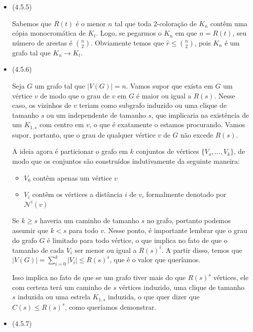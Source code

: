 \documentclass{article}
\begin{document}
\begin{itemize}
	\item (4.5.5)

	      Sabemos que \(R(t)\) é o menor \(n\) tal que toda 2-coloração de \(K_n\) contêm uma cópia monocromática de \(K_t\). Logo, se pegarmos o \(K_n\) em que \(n = R(t)\), seu número de arestas é \(\binom{n}{2}\). Obviamente temos que
	      \(\hat{r} \leq \binom{n}{2}\), pois \(K_n\) é um grafo tal que \(K_n \rightarrow K_t\).

	\item (4.5.6)

	      Seja \(G\) um grafo tal que \(|V(G)| = n\). Vamos supor que exista em \(G\) um vértice \(v\) de modo que o grau de \(v\) em \(G\) é maior ou igual a \(R(s)\).
	      Nesse caso, os vizinhos de \(v\) teriam como subgrafo induzido ou uma clique de tamanho \(s\) ou um independente de tamanho \(s\), que implicaria na existência de um \(K_{1, s}\) com centro em \(v\),
	      o que é exatamente o estamos procurando. Vamos supor, portanto, que o grau de qualquer vértice \(v\) de \(G\) não excede \(R(s)\).

	      A ideia agora é particionar o grafo em \(k\) conjuntos de vértices \(\{V_o, \dots, V_k\}\), de modo que os conjuntos são construídos indutivamente da seguinte maneira:

	      \begin{itemize}
		      \item \(V_0\) contêm apenas um vértice \(v\)
		      \item \(V_i\) contêm os vértices a distância \(i\) de \(v\), formalmente denotado por \(\mathcal{N}^i(v)\)
	      \end{itemize}

	      Se \(k \geq s\) haveria um caminho de tamanho \(s\) no grafo, portanto podemos assumir que \(k < s\) para todo \(v\).
	      Nesse ponto, é importante lembrar que o grau do grafo \(G\) é limitado para todo vértice, o que implica no fato de que o tamanho de cada \(V_i\)
	      ser menor ou igual a \(R(s)^i\). A partir disso, temos que \(|V(G)| = \sum_{i=0}^k |V_i| \leq R(s)^s\), que é o valor que queríamos.

	      Isso implica no fato de que se um grafo tiver mais do que \(R(s)^s\) vértices, ele com certeza terá um caminho de \(s\) vértices induzido, uma clique de tamanho \(s\) induzida
	      ou uma estrela \(K_{1, s}\) induzida, o que quer dizer que \(C(s) \leq R(s)^s\), como queríamos demonstrar.

	\item (4.5.7)


\end{itemize}
\end{document}
